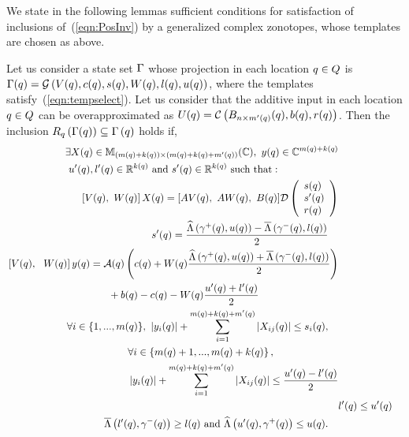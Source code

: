 We state in the following lemmas sufficient conditions for satisfaction of inclusions
of~(\ref{eqn:PosInv}) by a generalized complex zonotopes,
whose templates are chosen as above.
\begin{lemma}
  Let us consider a state set $\Gamma$ whose projection in each
  location $q\in Q$ is $\Gamma(q)
  = \mathcal{G}\left(V(q),c(q),s(q),W(q),l(q),u(q)\right)$, where
  the templates satisfy~(\ref{eqn:tempselect}).  Let us consider that
  the additive input in each location $q\in Q$ can be
  overapproximated as $U(q) = \mathcal{C}\left(B_{n\times
  m^\prime(q)}(q),b(q),r(q)\right)$.  Then the inclusion
  $R_{q}\left(\Gamma(q)\right) \subseteq \Gamma\left(q\right)$
  holds if,
\begin{align}
\begin{split}
& \exists
  X(\loc)\in\mat{\lt(m(\loc)+k(\loc)\rt)}{\lt(m(\loc)+k(\loc)+m^\pr(\loc)\rt)}{\mb{C}},~
  y(\loc)\in\mb{C}^{m(\loc)+k(\loc)}\\&~u^\pr(\loc),l^\pr(\loc)\in\realset^{k(\loc)}~\text{and}~s^\pr(\loc)\in\realset^{k(\loc)}~\text{such
    that}:
\end{split}\\
\begin{split}
& \left[V(\loc),~W(\loc)\rt]X(\loc) =
  [AV(\loc),~AW(\loc),~B(\loc)]\dg\lt(\cjoin{s(\loc)}{s^\pr(\loc)}{r(\loc)}\rt)\\
\end{split}\\
\begin{split}
& s^\pr(\loc) = \frac{\minaffine{\stay^+(\loc)}{u(\loc)}
      -\maxaffine{\stay^-(\loc)}{l(\loc)}}{2}
\end{split}\\
\begin{split}
  & \left[V(\loc),~~W(\loc)\rt]y(\loc) = 
    \map(\loc)\lt(c(\loc)+W(\loc)\frac{\minaffine{\stay^+(\loc)}{u(\loc)}
     +\maxaffine{\stay^-(\loc)}{l(\loc)}}{2}\rt)\\ & \hspace{10em} +
  b(\loc)-c(\loc)-W(\loc)\frac{u^\pr(\loc)+l^\pr(\loc)}{2}
\end{split}\\
\begin{split}
& \forall
i\in\tup{m(\loc)},~\lt|y_i(\loc)\rt|+\sum_{i=1}^{m(\loc)+k(\loc)+m^\pr(\loc)}\lt|X_{ij}(\loc)\rt|\leq
s_i(\loc),
\end{split}\\
\begin{split}
& \forall
i\in\lt\{m(\loc)+1,...,m(\loc)+k(\loc)\rt\},\\
&\lt|y_i(\loc)\rt|+\sum_{i=1}^{m(\loc)+k(\loc)+m^\pr(\loc)}\lt|X_{ij}(\loc)\rt|\leq
\frac{u^\pr(\loc)-l^\pr(\loc)}{2}
\end{split}\\
& l^\pr(\loc)\leq u^\pr(\loc)\\
\begin{split}
& \maxaffine{l^\pr(\loc)}{\stay^-(\loc)}\geq
l(\loc)~\text{and}~\minaffine{u^\pr(\loc)}{\stay^+(\loc)}\leq u(\loc).
\end{split}
\end{align}
\end{lemma}
